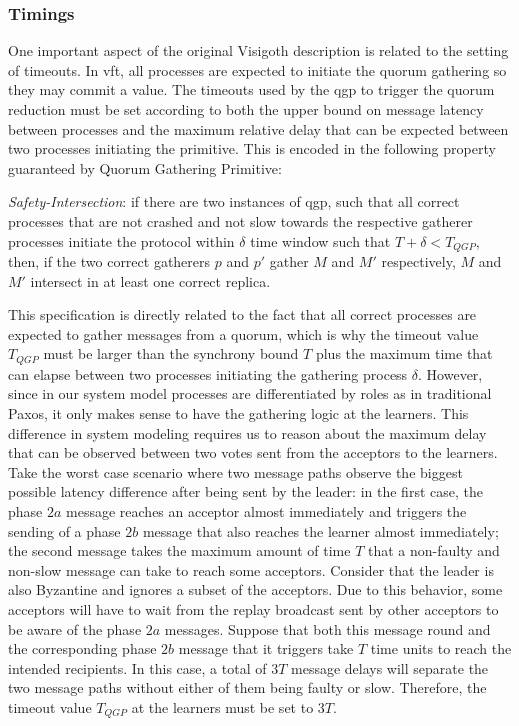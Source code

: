 \subsubsection{Timings}

One important aspect of the original Visigoth description is related to the setting of timeouts. In \acrshort{vft}, all processes are expected to initiate the quorum gathering so they may commit a value. The timeouts used by the \acrlong{qgp} to trigger the quorum reduction must be set according to both the upper bound on message latency between processes and the maximum relative delay that can be expected between two processes initiating the primitive. This is encoded in the following property guaranteed by Quorum Gathering Primitive: \par

\begin{displayquote}
\textit{Safety-Intersection}: if there are two instances of \acrshort{qgp}, such that all correct processes that are not crashed and not slow towards the respective gatherer processes initiate the protocol within $\delta$ time window such that $T+\delta < T_{QGP}$, then, if the two correct gatherers $p$ and $p'$ gather $M$ and $M'$ respectively, $M$ and $M'$ intersect in at least one correct replica.
\end{displayquote}

This specification is directly related to the fact that all correct processes are expected to gather messages from a quorum, which is why the timeout value $T_{QGP}$ must be larger than the synchrony bound $T$ plus the maximum time that can elapse between two processes initiating the gathering process $\delta$. However, since in our system model processes are differentiated by roles as in traditional Paxos, it only makes sense to have the gathering logic at the learners. This difference in system modeling requires us to reason about the maximum delay that can be observed between two votes sent from the acceptors to the learners. Take the worst case scenario where two message paths observe the biggest possible latency difference after being sent by the leader: in the first case, the phase $2a$ message reaches an acceptor almost immediately and triggers the sending of a phase $2b$ message that also reaches the learner almost immediately; the second message takes the maximum amount of time $T$ that a non-faulty and non-slow message can take to reach some acceptors. Consider that the leader is also Byzantine and ignores a subset of the acceptors. Due to this behavior, some acceptors will have to wait from the replay broadcast sent by other acceptors to be aware of the phase $2a$ messages. Suppose that both this message round and the corresponding phase $2b$ message that it triggers take $T$ time units to reach the intended recipients. In this case, a total of $3T$ message delays will separate the two message paths without either of them being faulty or slow. Therefore, the timeout value $T_{QGP}$ at the learners must be set to $3T$.

